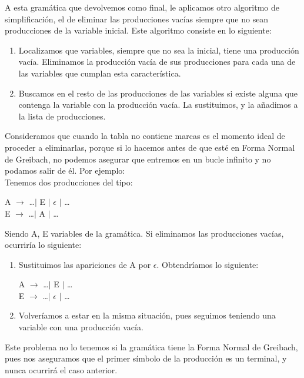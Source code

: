 \documentclass[12pt,a4paper,spanish]{book}
\begin{document}
A esta gram\'atica que devolvemos como final, le aplicamos otro algoritmo de simplificaci\'on, el de eliminar las producciones vac\'ias siempre que no sean producciones de la variable inicial. 
Este algoritmo consiste en lo siguiente:
\begin{enumerate}
\item Localizamos que variables, siempre que no sea la inicial, tiene una producci\'on vac\'ia. Eliminamos la producci\'on vac\'ia de sus producciones para cada una de las variables que cumplan esta caracter\'istica.
\item Buscamos en el resto de las producciones de las variables si existe alguna que contenga la variable con la producci\'on vac\'ia. La sustituimos, y la a\~nadimos a la lista de producciones.
\end{enumerate}
Consideramos que cuando la tabla no contiene marcas es el momento ideal de proceder a eliminarlas, porque si lo hacemos antes de que est\'e en Forma Normal de Greibach, no podemos asegurar que entremos en un bucle infinito y no podamos salir de \'el. Por ejemplo:\\
Tenemos dos producciones del tipo:\\
\begin{center}
A $\rightarrow$ \ldots $\mid$ E $\mid$ $\epsilon$ $\mid$ \ldots\\
E $\rightarrow$ \ldots $\mid$ A $\mid$ \ldots\\
\end{center}
Siendo A, E variables de la gram\'atica. Si eliminamos las producciones vac\'ias, ocurrir\'ia lo siguiente:\\
\begin{enumerate}	
\item Sustituimos  las apariciones de A por $\epsilon$. Obtendr\'iamos lo siguiente:\\
\begin{center}
	A $\rightarrow$ \ldots $\mid$ E $\mid$ \ldots\\
	E $\rightarrow$ \ldots $\mid$ $\epsilon$ $\mid$ \ldots\\
\end{center}
\item Volver\'iamos a estar en la misma situaci\'on, pues seguimos teniendo una variable con una producci\'on vac\'ia.
\end{enumerate}
Este problema no lo tenemos si la gram\'atica tiene la Forma Normal de Greibach, pues nos aseguramos que el primer s\'imbolo de la producci\'on es un terminal, y nunca ocurrir\'a el caso anterior. 
\end{document}
